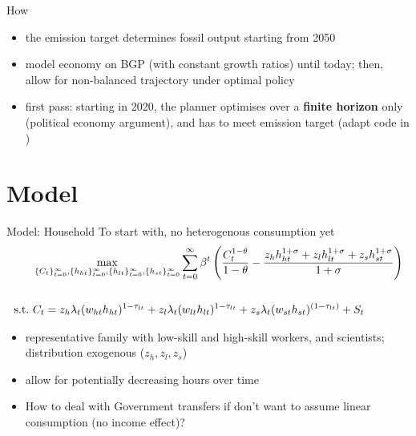\documentclass[11pt,aspectratio=169]{beamer}
\begin{document}
\begin{frame}{How}
	\begin{itemize}
		\item<+-> the emission target determines fossil output starting from 2050
		\vspace{3mm}
		\item<+-> model economy on BGP (with constant growth ratios) until today; then, allow for non-balanced trajectory under optimal policy
		\vspace{3mm}
		\item<+-> first pass: starting in 2020, the planner optimises over a \textbf{finite horizon} only (political economy argument), and has to meet emission target (adapt code in \cite{Barrage2019OptimalPolicy})
	\end{itemize}
\end{frame}

\section{Model}
\begin{frame}{Model: Household}
\alert{	To start with, no heterogenous consumption yet}\\
\begin{align*}
& \max_{\{C_t\}_{t=0}^\infty, \{h_{ht}\}_{t=0}^\infty, \{h_{lt}\}_{t=0}^\infty, \{h_{st}\}_{t=0}^\infty} \sum_{t=0}^\infty \beta^t \left(\frac{C_t^{1-\theta}}{1-\theta}-\frac{z_hh_{ht}^{1+\sigma}+z_lh_{lt}^{1+\sigma}+z_sh_{st}^{1+\sigma}}{1+\sigma}\right) %
\\
\vspace{3mm}
\\
\text{s.t.}\ \vspace{4mm}& C_t=z_h \lambda_t (w_{ht}h_{ht})^{1-\tau_{lt}}+z_l \lambda_t (w_{lt}h_{lt})^{1-\tau_{lt}}+z_s\lambda_t(w_{st}h_{st})^{(1-\tau_{lt})}+S_t\\
\end{align*}
\vspace{-15mm}
\begin{itemize}
	\item<+-> representative family with low-skill and high-skill workers, and scientists; distribution exogenous ($z_h,z_l, z_s$)
	\vspace{2mm}
	\item<+-> allow for potentially decreasing hours over time \citep{Boppart2019LaborPerspectiveb}
	\vspace{2mm}
	\item<+-> How to deal with Government transfers if don't want to assume linear consumption (no income effect)?
\end{itemize}
\end{frame}
\end{document}
